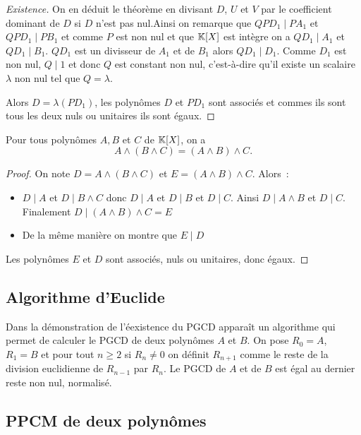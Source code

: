 \begin{proof}[Existence]
  On en déduit le théorème en divisant \(D\), \(U\) et \(V\) par le coefficient dominant de \(D\) si \(D\) n'est pas nul.Ainsi on remarque que  \(QPD_1 \mid{}PA_1\) et \(QPD_1\mid{}PB_1\) et comme \(P\) est non nul et que \(\mathbb{K}[X]\) est intègre on a \(QD_1 \mid{}A_1\) et \(QD_1\mid{}B_1\). \(QD_1\) est un divisseur de \(A_1\) et de \(B_1\) alors \(QD_1\mid{}D_1\). Comme \(D_1\) est non nul, \(Q\mid{}1\) et donc \(Q\) est constant non nul, c'est-à-dire qu'il existe un scalaire \(\lambda\) non nul tel que \(Q=\lambda\). 

  Alors \(D=\lambda(PD_1)\), les polynômes \(D\) et \(PD_1\) sont associés et commes ils sont tous les deux nuls ou unitaires ils sont égaux.
\end{proof}

\begin{prop}[Associativité]
  Pour tous polynômes \(A,B\) et \(C\) de \(\mathbb{K}[X]\), on a
  \begin{equation}
    A \wedge (B\wedge C) = (A\wedge B) \wedge C.
  \end{equation}
\end{prop}
\begin{proof}
  On note \(D=A \wedge (B\wedge C)\) et \(E=(A\wedge B) \wedge C\). Alors~:
  \begin{itemize}
  \item \(D\mid{}A\) et \(D\mid{}B \wedge C\) donc \(D\mid{}A\) et \(D\mid{}B\) et \(D\mid{} C\). Ainsi \(D\mid{}A \wedge B\) et \(D\mid{}C\). Finalement \(D\mid{}(A\wedge B) \wedge C=E\)
  \item De la même manière on montre que \(E\mid{}D\)
  \end{itemize}
  Les polynômes \(E\) et \(D\) sont associés, nuls ou unitaires, donc égaux.
\end{proof}

\subsection{Algorithme d'Euclide}

Dans la démonstration de l'éexistence du PGCD apparaît un algorithme qui permet de calculer le PGCD de deux polynômes \(A\) et \(B\). On pose \(R_0=A\), \(R_1=B\) et pour tout \(n\geqslant 2\)
 si \(R_n \neq 0\) on définit \(R_{n+1}\) comme le reste de la division euclidienne de \(R_{n-1}\) par \(R_n\). Le PGCD de \(A\) et de \(B\) est égal au dernier reste non nul, normalisé.

\subsection{PPCM de deux polynômes}

